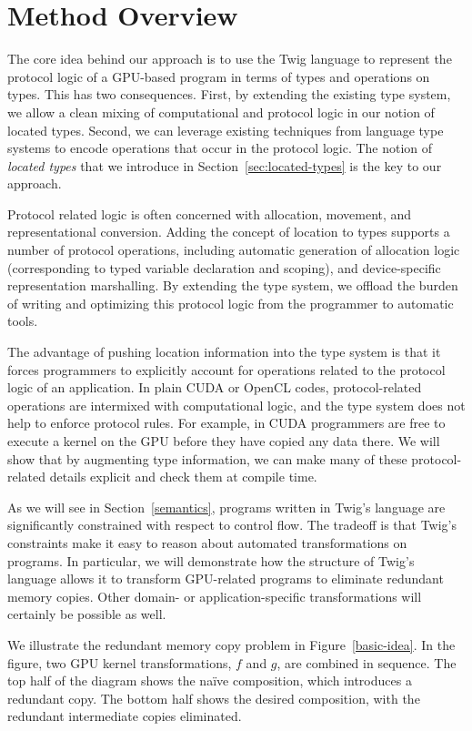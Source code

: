 
\section{Method Overview}

The core idea behind our approach is to use the Twig language to represent the protocol logic of a GPU-based program in terms of types and operations on types. This has two consequences. First, by extending the existing type system, we allow a clean mixing of computational and protocol logic in our notion of located types. Second, we can leverage existing techniques from language type systems to encode operations that occur in the protocol logic. The notion of \emph{located types} that we introduce in Section~\ref{sec:located-types} is the key to our approach.

Protocol related logic is often concerned with allocation, movement, and representational conversion. Adding the concept of location to types supports a number of protocol operations, including automatic generation of allocation logic (corresponding to typed variable declaration and scoping), and device-specific representation marshalling. By extending the type system, we offload the burden of writing and optimizing this protocol logic from the programmer to automatic tools.

The advantage of pushing location information into the type system is that it forces programmers to explicitly account for operations related to the protocol logic of an application. In plain CUDA or OpenCL codes, protocol-related operations are intermixed with computational logic, and the type system does not help to enforce protocol rules. For example, in CUDA programmers are free to execute a kernel on the GPU before they have copied any data there. We will show that by augmenting type information, we can make many of these protocol-related details explicit and check them at compile time.

As we will see in Section~\ref{semantics}, programs written in Twig's language are significantly constrained with respect to control flow. The tradeoff is that Twig's constraints make it easy to reason about automated transformations on programs. In particular, we will demonstrate how the structure of Twig's language allows it to transform GPU-related programs to eliminate redundant memory copies. Other domain- or application-specific transformations will certainly be possible as well.

We illustrate the redundant memory copy problem in Figure~\ref{basic-idea}. In the figure, two GPU kernel transformations, $f$ and $g$, are combined in sequence. The top half of the diagram shows the na\"ive composition, which introduces a redundant copy. The bottom half shows the desired composition, with the redundant intermediate copies eliminated.

